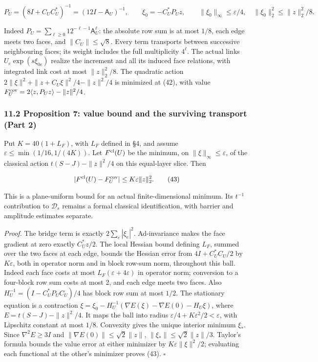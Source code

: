 \documentclass[11pt,a4paper]{article}
\begin{document}
\[P_U=(8I+C_UC_U^*)^{-1}=(12I-\mathsf A_U)^{-1},\qquad
\xi_0=-C_U^*P_Uz,\qquad
\|\xi_0\|_\infty\le\varepsilon/4,\quad
\|\xi_0\|_2^2\le\|z\|_2^2/8.\tag{42}\]

Indeed \(P_U=\sum_{\ell\ge0}12^{-\ell-1}\mathsf A_U^\ell\): the absolute
row sum is at most \(1/8\), each edge meets two faces, and
\(\|C_U\|\le\sqrt8\). Every term transports between successive
neighbouring faces; its weight includes the full multiplicity
\(4^\ell\). The actual links \(U_e\exp(s\xi_{0e})\) realize the
increment and all its induced face relations, with integrated link cost
at most \(\|z\|_2^2/8\). The quadratic action
\(2\|\xi\|^2+\|z+C_U\xi\|^2/4-\|z\|^2/4\) is minimized at (42), with
value \(F_U^{\rm cov}=2\langle z,P_Uz\rangle-\|z\|^2/4\).

\hypertarget{proposition-7-value-bound-and-the-surviving-transport-part-2}{%
\subsubsection{11.2 Proposition 7: value bound and the surviving
transport (Part
2)}\label{proposition-7-value-bound-and-the-surviving-transport-part-2}}

Put \(K=40(1+L_F)\), with \(L_F\) defined in §4, and assume
\(\varepsilon\le\min(1/16,1/(4K))\). Let \(F^{\rm cl}(U)\) be the
minimum, on \(\|\xi\|_\infty\le\varepsilon\), of the classical action
\(t(S-J)-\|z\|^2/4\) on this equal-layer slice. Then

\[|F^{\rm cl}(U)-F_U^{\rm cov}|\le
K\varepsilon\|z\|_2^2.\tag{43}\]

This is a plane-uniform bound for an actual finite-dimensional minimum.
Its \(t^{-1}\) contribution to \(\mathcal D_s\) remains a formal
classical identification, with barrier and amplitude estimates separate.

\emph{Proof.} The bridge term is exactly \(2\sum_e|\xi_e|^2\).
Ad-invariance makes the face gradient at zero exactly \(C_U^*z/2\). The
local Hessian bound defining \(L_F\), summed over the two faces at each
edge, bounds the Hessian error from \(4I+C_U^*C_U/2\) by
\(K\varepsilon\), both in operator norm and in block row-sum norm,
throughout this ball. Indeed each face costs at most
\(L_F(\varepsilon+4\varepsilon)\) in operator norm; conversion to a
four-block row sum costs at most 2, and each edge meets two faces. Also
\(H_U^{-1}=(I-C_U^*P_UC_U)/4\) has block row sum at most \(1/2\). The
stationary equation is a contraction
\(\xi=\xi_0-H_U^{-1}(\nabla E(\xi)-\nabla E(0)-H_U\xi)\), where
\(E=t(S-J)-\|z\|^2/4\). It maps the ball into radius
\(\varepsilon/4+K\varepsilon^2/2<\varepsilon\), with Lipschitz constant
at most \(1/8\). Convexity gives the unique interior minimum \(\xi_*\).
Since \(\nabla^2E\ge3I\) and \(\|\nabla E(0)\|\le\sqrt2\|z\|\),
\(\|\xi_*\|\le\sqrt2\|z\|/3\). Taylor's formula bounds the value error
at either minimizer by \(K\varepsilon\|\xi\|^2/2\); evaluating each
functional at the other's minimizer proves (43). \(\square\)
\end{document}
